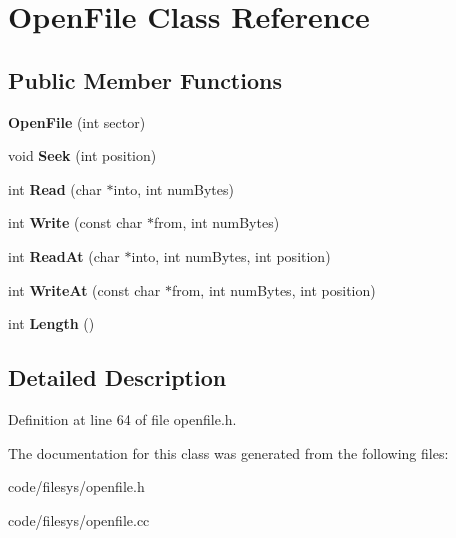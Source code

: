 \section{Open\+File Class Reference}
\label{class_open_file}
\subsection*{Public Member Functions}
\begin{DoxyCompactItemize}
\item 
{\bfseries Open\+File} (int sector)\label{class_open_file_a89136ac6b54013a413398f9496d39963}

\item 
void {\bfseries Seek} (int position)\label{class_open_file_a00f20ca65c80be4e6039a9f04cb03374}

\item 
int {\bfseries Read} (char $\ast$into, int num\+Bytes)\label{class_open_file_af87bf2b0b15fa3501dada45a1a284bf4}

\item 
int {\bfseries Write} (const char $\ast$from, int num\+Bytes)\label{class_open_file_a87c9a57b565f2503d59a1e32f68163c9}

\item 
int {\bfseries Read\+At} (char $\ast$into, int num\+Bytes, int position)\label{class_open_file_a0af8cd52ec71a2ad407039cebee2ef3d}

\item 
int {\bfseries Write\+At} (const char $\ast$from, int num\+Bytes, int position)\label{class_open_file_afdafc019e4fa166c44e8f7d4f820166f}

\item 
int {\bfseries Length} ()\label{class_open_file_a5d5618da2388829f294c3f33017fadac}

\end{DoxyCompactItemize}


\subsection{Detailed Description}


Definition at line 64 of file openfile.\+h.



The documentation for this class was generated from the following files\+:\begin{DoxyCompactItemize}
\item 
code/filesys/openfile.\+h\item 
code/filesys/openfile.\+cc\end{DoxyCompactItemize}
